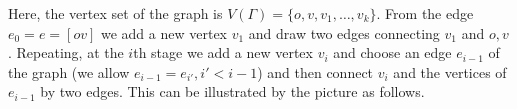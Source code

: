 \documentclass[11pt]{amsart}
\theoremstyle{definition}
\theoremstyle{remark}
\numberwithin{equation}{section}
\begin{document}
Here, the vertex set of the graph is $V(\Gamma)=\{o,v,v_1,\dots,v_k\}$.
From the edge $e_0=e=[ov]$ we add a new vertex $v_1$ and draw two edges connecting $v_1$ and $o,v$.
Repeating, at the $i$th stage we add a new vertex $v_i$ and choose an edge $e_{i-1}$ of the graph (we allow $e_{i-1}=e_{i'},i'<i-1$) and then connect $v_i$ and the vertices of $e_{i-1}$ by two edges. This can be illustrated by the picture as follows.
\begin{figure}[htb]
  \centering



\begin{tikzpicture}[x=0.75pt,y=0.75pt,yscale=-1,xscale=1]


\end{tikzpicture}
\end{figure}
\end{document}
